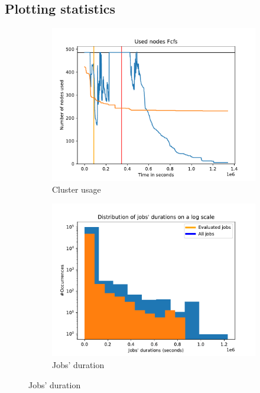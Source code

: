 \documentclass[a4paper]{article}
\begin{document}
\subsection{Plotting statistics}

\begin{figure}[H]\centering
\begin{subfigure}[b]{0.4\linewidth}\centering\includegraphics[width=1\linewidth]{MBSS/plot/2022-01-17->2022-01-19_Fcfs_Used_nodes_450_128_32_256_4_1024.pdf}\caption{Cluster usage}\label{37}\end{subfigure}
\begin{subfigure}[b]{0.4\linewidth}\centering\includegraphics[width=1\linewidth]{MBSS/plot/Distribution/2022-01-17->2022-01-19_delay.pdf}\caption{Jobs' duration}\label{38}\end{subfigure}

\end{figure}
\end{document}
